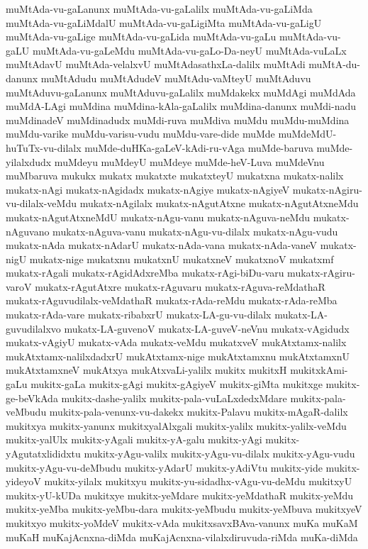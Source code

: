 {muMtAda-vu-gaLanunx
muMtAda-vu-gaLalilx
muMtAda-vu-gaLiMda
muMtAda-vu-gaLiMdalU
muMtAda-vu-gaLigiMta
muMtAda-vu-gaLigU
muMtAda-vu-gaLige
muMtAda-vu-gaLida
muMtAda-vu-gaLu
muMtAda-vu-gaLU
muMtAda-vu-gaLeMdu
muMtAda-vu-gaLo-Da-neyU
muMtAda-vuLaLx
muMtAdavU
muMtAda-velalxvU
muMtAdasathxLa-dalilx
muMtAdi
muMtA-du-danunx
muMtAdudu
muMtAdudeV
muMtAdu-vaMteyU
muMtAduvu
muMtAduvu-gaLanunx
muMtAduvu-gaLalilx
muMdakekx
muMdAgi
muMdAda
muMdA-LAgi
muMdina
muMdina-kAla-gaLalilx
muMdina-danunx
muMdi-nadu
muMdinadeV
muMdinadudx
muMdi-ruva
muMdiva
muMdu
muMdu-muMdina
muMdu-varike
muMdu-varisu-vudu
muMdu-vare-dide
muMde
muMdeMdU-huTuTx-vu-dilalx
muMde-duHKa-gaLeV-kAdi-ru-vAga
muMde-baruva
muMde-yilalxdudx
muMdeyu
muMdeyU
muMdeye
muMde-heV-Luva
muMdeVnu
muMbaruva
mukukx
mukatx
mukatxte
mukatxteyU
mukatxna
mukatx-nalilx
mukatx-nAgi
mukatx-nAgidadx
mukatx-nAgiye
mukatx-nAgiyeV
mukatx-nAgiru-vu-dilalx-veMdu
mukatx-nAgilalx
mukatx-nAgutAtxne
mukatx-nAgutAtxneMdu
mukatx-nAgutAtxneMdU
mukatx-nAgu-vanu
mukatx-nAguva-neMdu
mukatx-nAguvano
mukatx-nAguva-vanu
mukatx-nAgu-vu-dilalx
mukatx-nAgu-vudu
mukatx-nAda
mukatx-nAdarU
mukatx-nAda-vana
mukatx-nAda-vaneV
mukatx-nigU
mukatx-nige
mukatxnu
mukatxnU
mukatxneV
mukatxnoV
mukatxmf
mukatx-rAgali
mukatx-rAgidAdxreMba
mukatx-rAgi-biDu-varu
mukatx-rAgiru-varoV
mukatx-rAgutAtxre
mukatx-rAguvaru
mukatx-rAguva-reMdathaR
mukatx-rAguvudilalx-veMdathaR
mukatx-rAda-reMdu
mukatx-rAda-reMba
mukatx-rAda-vare
mukatx-ribabxrU
mukatx-LA-gu-vu-dilalx
mukatx-LA-guvudilalxvo
mukatx-LA-guvenoV
mukatx-LA-guveV-neVnu
mukatx-vAgidudx
mukatx-vAgiyU
mukatx-vAda
mukatx-veMdu
mukatxveV
mukAtxtamx-nalilx
mukAtxtamx-nalilxdadxrU
mukAtxtamx-nige
mukAtxtamxnu
mukAtxtamxnU
mukAtxtamxneV
mukAtxya
mukAtxvaLi-yalilx
mukitx
mukitxH
mukitxkAmi-gaLu
mukitx-gaLa
mukitx-gAgi
mukitx-gAgiyeV
mukitx-giMta
mukitxge
mukitx-ge-beVkAda
mukitx-dashe-yalilx
mukitx-pala-vuLaLxdedxMdare
mukitx-pala-veMbudu
mukitx-pala-venunx-vu-dakekx
mukitx-Palavu
mukitx-mAgaR-dalilx
mukitxya
mukitx-yanunx
mukitxyalAlxgali
mukitx-yalilx
mukitx-yalilx-veMdu
mukitx-yalUlx
mukitx-yAgali
mukitx-yA-galu
mukitx-yAgi
mukitx-yAgutatxlididxtu
mukitx-yAgu-valilx
mukitx-yAgu-vu-dilalx
mukitx-yAgu-vudu
mukitx-yAgu-vu-deMbudu
mukitx-yAdarU
mukitx-yAdiVtu
mukitx-yide
mukitx-yideyoV
mukitx-yilalx
mukitxyu
mukitx-yu-sidadhx-vAgu-vu-deMdu
mukitxyU
mukitx-yU-kUDa
mukitxye
mukitx-yeMdare
mukitx-yeMdathaR
mukitx-yeMdu
mukitx-yeMba
mukitx-yeMbu-dara
mukitx-yeMbudu
mukitx-yeMbuva
mukitxyeV
mukitxyo
mukitx-yoMdeV
mukitx-vAda
mukitxsavxBAva-vanunx
muKa
muKaM
muKaH
muKajAcnxna-diMda
muKajAcnxna-vilalxdiruvuda-riMda
muKa-diMda
}
